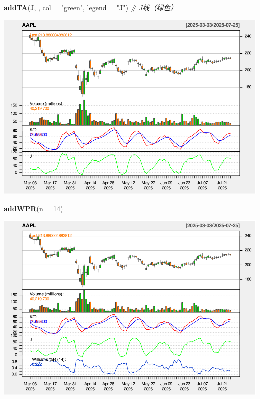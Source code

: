 \documentclass[]{ctexbook}
\newenvironment{Shaded}{\begin{snugshade}}{\end{snugshade}}
\newcommand{\AttributeTok}[1]{\textcolor[rgb]{0.13,0.29,0.53}{#1}}
\newcommand{\CommentTok}[1]{\textcolor[rgb]{0.56,0.35,0.01}{\textit{#1}}}
\newcommand{\DecValTok}[1]{\textcolor[rgb]{0.00,0.00,0.81}{#1}}
\newcommand{\FunctionTok}[1]{\textcolor[rgb]{0.13,0.29,0.53}{\textbf{#1}}}
\newcommand{\NormalTok}[1]{#1}
\newcommand{\StringTok}[1]{\textcolor[rgb]{0.31,0.60,0.02}{#1}}
\begin{document}
\begin{Shaded}
\begin{Highlighting}[]
\FunctionTok{addTA}\NormalTok{(J, , }\AttributeTok{col =} \StringTok{"green"}\NormalTok{, }\AttributeTok{legend =} \StringTok{"J"}\NormalTok{)  }\CommentTok{\# J线（绿色）}
\end{Highlighting}
\end{Shaded}

\includegraphics[width=0.9\linewidth]{QuantmodHandbook_files/figure-latex/wpr_2-4}

\begin{Shaded}
\begin{Highlighting}[]
\FunctionTok{addWPR}\NormalTok{(}\AttributeTok{n =} \DecValTok{14}\NormalTok{)}
\end{Highlighting}
\end{Shaded}

\includegraphics[width=0.9\linewidth]{QuantmodHandbook_files/figure-latex/wpr_2-5}
\end{document}
